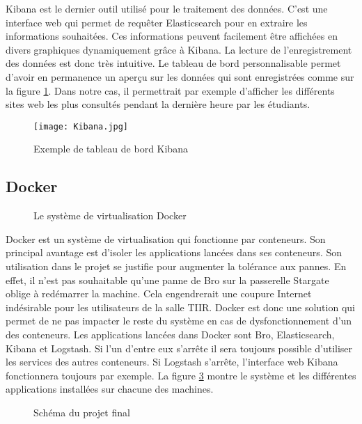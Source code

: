 Kibana est le dernier outil utilisé pour le traitement des données. C'est une interface web qui permet de requêter Elasticsearch pour en extraire les informations souhaitées. Ces informations peuvent facilement être affichées en divers graphiques dynamiquement grâce à Kibana. La lecture de l'enregistrement des données est donc très intuitive. Le tableau de bord personnalisable permet d'avoir en permanence un aperçu sur les données qui sont enregistrées comme sur la figure \ref{kibana}. Dans notre cas, il permettrait par exemple d'afficher les différents sites web les plus consultés pendant la dernière heure par les étudiants.

\begin{figure}[!h]
\centering
\texttt{[image: Kibana.jpg]}
\caption{Exemple de tableau de bord Kibana}
\label{kibana}
\end{figure}

\subsection{Docker}

\begin{figure}[!h]
\centering
\def\svgwidth{0.5\columnwidth}

\caption{Le système de virtualisation Docker}
\label{docker}
\end{figure}

Docker est un système de virtualisation qui fonctionne par conteneurs. Son principal avantage est d'isoler les applications lancées dans ses conteneurs. Son utilisation dans le projet se justifie pour augmenter la tolérance aux pannes. En effet, il n'est pas souhaitable qu'une panne de Bro sur la passerelle Stargate oblige à redémarrer la machine. Cela engendrerait une coupure Internet indésirable pour les utilisateurs de la salle TIIR. Docker est donc une solution qui permet de ne pas impacter le reste du système en cas de dysfonctionnement d'un des conteneurs. Les applications lancées dans Docker sont Bro, Elasticsearch, Kibana et Logstash. Si l'un d'entre eux s'arrête il sera toujours possible d'utiliser les services des autres conteneurs. Si Logstash s'arrête, l'interface web Kibana fonctionnera toujours par exemple. La figure \ref{projet_final} montre le système et les différentes applications installées sur chacune des machines.

\begin{figure}[!h]
\centering
\def\svgwidth{\columnwidth}

\caption{Schéma du projet final}
\label{projet_final}
\end{figure}



